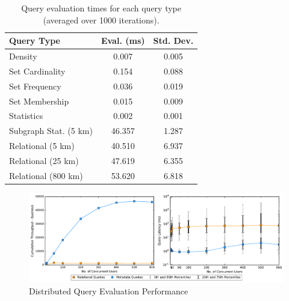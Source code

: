 \begin{table}[h!]
    \renewcommand{\arraystretch}{1.4}
    \caption{Query evaluation times for each query type (averaged over 1000 iterations).}
    \label{tbl:query-times}
    \begin{center}
        \begin{tabular}{|l|c|c|}
            \hline
            \textbf{Query Type}      & \textbf{Eval. (ms)} & \textbf{Std. Dev.} \\
            \hline
            Density                  & 0.007                    & 0.005 \\
            \hline
            Set Cardinality          & 0.154                    & 0.088 \\
            \hline
            Set Frequency            & 0.036                    & 0.019 \\
            \hline
            Set Membership           & 0.015                    & 0.009 \\
            \hline
            Statistics               & 0.002                    & 0.001 \\
            \hline
            \hline
            Subgraph Stat. (5 km)    & 46.357                   & 1.287 \\
            \hline
            Relational (5 km)        & 40.510                   & 6.937 \\
            \hline
            Relational (25 km)       & 47.619                   & 6.355 \\
            \hline
            Relational (800 km)      & 53.620                   & 6.818 \\
            \hline
        \end{tabular}
    \end{center}
\end{table}
\begin{figure}
    \centerline{\includegraphics[width=\linewidth]{figures/query_benchmark_both.pdf}}
    \caption{Distributed Query Evaluation Performance}
    \label{fig:dist-query}
\end{figure}



